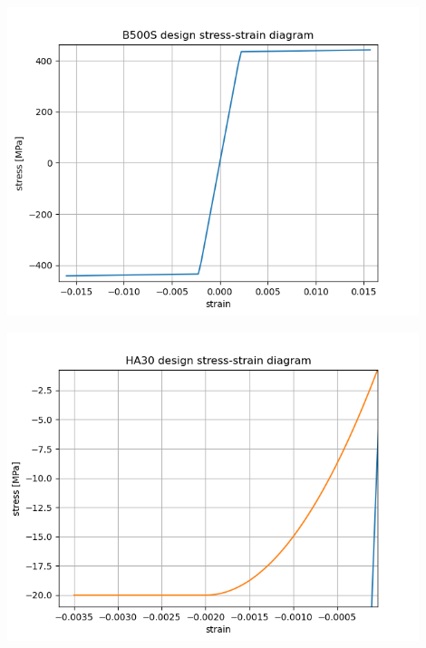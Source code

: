 \begin{center}
\includegraphics[width=120mm]{results/graphics/sections/B500S_design_stress_strain_diagram}
\end{center}
\begin{center}
\includegraphics[width=120mm]{results/graphics/sections/HA30_design_stress_strain_diagram}
\end{center}
